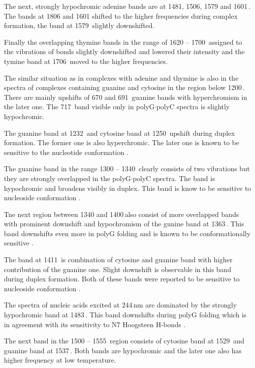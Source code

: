 The next, strongly hypochromic adenine bands are at 1481, 1506, 1579 and
1601\,\icm{}. The bands at 1806 and 1601 shifted to the higher frequencies
during complex formation, the band at 1579\,\icm{} slightly downshifted.

Finally the overlapping thymine bands in the range of 1620 -- 1700\,\icm{}
assigned to the vibrations of  bonds slightly downshifted and lowered
their intensity and the tymine band at 1706\,\icm{} moved to the higher
frequencies.

The similar situation as in complexes with adenine and thymine is also in the
spectra of complexes containing guanine and cytosine in the region below
1200\,\icm{}.
There are mainly upshifts of 670 and 691\,\icm{} guanine bands with
hyperchromism in the later one.
The 717\,\icm{} band visible only in polyG$\cdot$polyC spectra is slightly
hypochromic.

The guanine band at 1232\,\icm{} and cytosine band at 1250\,\icm{} upshift
during duplex formation. The former one is also hyperchromic.
The later one is known to be sensitive to the nucleotide conformation
\parencite{%
	Benevides2005,%
	Hernandez2005%
}.

The guanine band in the range 1300 -- 1340\,\icm{} clearly consists of two
vibrations but they are strongly overlapped in the polyG$\cdot$polyC spectra.
The band is hypochromic and broadens visibly in duplex. This band is know to be
sensitive to nucleoside conformation
\parencite{Benevides2005}.

Tne next region between 1340 and 1400\,\icm also consist of more overlapped
bands with prominent downshift and hypochromism of the gunine band at
1363\,\icm{}.
This band downshifts even more in polyG folding and is known to be
conformationally sensitive
\parencite{Nishimura1986b}.

The band at 1411\,\icm{} is combination of cytosine and guanine band with
higher contribution of the guanine one.
Slight downshift is observable in this band during duplex formation.
Both of these bands were reported to be sensitive to nucleoside conformation
\parencite{Nishimura1986b}.

The spectra of nucleic acids excited at 244\,nm are dominated by the strongly
hypochromic band at 1483\,\icm{}.
This band downshifts during polyG folding which is in agreement with its
sensitivity to N7 Hoogsteen H-bonds
\parencite{Palacky2013}.

The next band in the 1500 -- 1555\,\icm{} region consists of cytosine band at
1529\,\icm{} and guanine band at 1537\,\icm{}. Both bands are hypochromic and
the later one also has higher frequency at low temperature.

